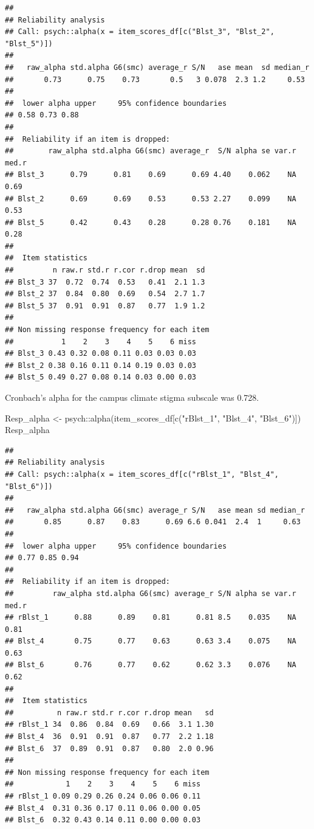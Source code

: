 \documentclass[
  english,
]{book}
\newenvironment{Shaded}{\begin{snugshade}}{\end{snugshade}}
\newcommand{\FunctionTok}[1]{\textcolor[rgb]{0.00,0.00,0.00}{#1}}
\newcommand{\NormalTok}[1]{#1}
\newcommand{\OtherTok}[1]{\textcolor[rgb]{0.56,0.35,0.01}{#1}}
\newcommand{\SpecialCharTok}[1]{\textcolor[rgb]{0.00,0.00,0.00}{#1}}
\newcommand{\StringTok}[1]{\textcolor[rgb]{0.31,0.60,0.02}{#1}}
\begin{document}
\begin{verbatim}
## 
## Reliability analysis   
## Call: psych::alpha(x = item_scores_df[c("Blst_3", "Blst_2", "Blst_5")])
## 
##   raw_alpha std.alpha G6(smc) average_r S/N   ase mean  sd median_r
##       0.73      0.75    0.73       0.5   3 0.078  2.3 1.2     0.53
## 
##  lower alpha upper     95% confidence boundaries
## 0.58 0.73 0.88 
## 
##  Reliability if an item is dropped:
##        raw_alpha std.alpha G6(smc) average_r  S/N alpha se var.r med.r
## Blst_3      0.79      0.81    0.69      0.69 4.40    0.062    NA  0.69
## Blst_2      0.69      0.69    0.53      0.53 2.27    0.099    NA  0.53
## Blst_5      0.42      0.43    0.28      0.28 0.76    0.181    NA  0.28
## 
##  Item statistics 
##         n raw.r std.r r.cor r.drop mean  sd
## Blst_3 37  0.72  0.74  0.53   0.41  2.1 1.3
## Blst_2 37  0.84  0.80  0.69   0.54  2.7 1.7
## Blst_5 37  0.91  0.91  0.87   0.77  1.9 1.2
## 
## Non missing response frequency for each item
##           1    2    3    4    5    6 miss
## Blst_3 0.43 0.32 0.08 0.11 0.03 0.03 0.03
## Blst_2 0.38 0.16 0.11 0.14 0.19 0.03 0.03
## Blst_5 0.49 0.27 0.08 0.14 0.03 0.00 0.03
\end{verbatim}

Cronbach's alpha for the campus climate stigma subscale was 0.728.

\begin{Shaded}
\begin{Highlighting}[]
\NormalTok{Resp\_alpha }\OtherTok{\textless{}{-}}\NormalTok{ psych}\SpecialCharTok{::}\FunctionTok{alpha}\NormalTok{(item\_scores\_df[}\FunctionTok{c}\NormalTok{(}\StringTok{"rBlst\_1"}\NormalTok{, }\StringTok{"Blst\_4"}\NormalTok{, }\StringTok{"Blst\_6"}\NormalTok{)])}
\NormalTok{Resp\_alpha}
\end{Highlighting}
\end{Shaded}

\begin{verbatim}
## 
## Reliability analysis   
## Call: psych::alpha(x = item_scores_df[c("rBlst_1", "Blst_4", "Blst_6")])
## 
##   raw_alpha std.alpha G6(smc) average_r S/N   ase mean sd median_r
##       0.85      0.87    0.83      0.69 6.6 0.041  2.4  1     0.63
## 
##  lower alpha upper     95% confidence boundaries
## 0.77 0.85 0.94 
## 
##  Reliability if an item is dropped:
##         raw_alpha std.alpha G6(smc) average_r S/N alpha se var.r med.r
## rBlst_1      0.88      0.89    0.81      0.81 8.5    0.035    NA  0.81
## Blst_4       0.75      0.77    0.63      0.63 3.4    0.075    NA  0.63
## Blst_6       0.76      0.77    0.62      0.62 3.3    0.076    NA  0.62
## 
##  Item statistics 
##          n raw.r std.r r.cor r.drop mean   sd
## rBlst_1 34  0.86  0.84  0.69   0.66  3.1 1.30
## Blst_4  36  0.91  0.91  0.87   0.77  2.2 1.18
## Blst_6  37  0.89  0.91  0.87   0.80  2.0 0.96
## 
## Non missing response frequency for each item
##            1    2    3    4    5    6 miss
## rBlst_1 0.09 0.29 0.26 0.24 0.06 0.06 0.11
## Blst_4  0.31 0.36 0.17 0.11 0.06 0.00 0.05
## Blst_6  0.32 0.43 0.14 0.11 0.00 0.00 0.03
\end{verbatim}
\end{document}
